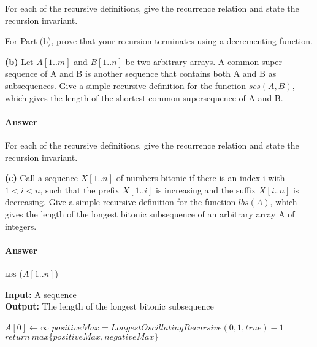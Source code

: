 \documentclass{article}
\begin{document}
For each of the recursive definitions, give the recurrence
relation and state the recursion invariant.

For Part (b), prove that your recursion terminates
using a decrementing function.

{\bf (b)} Let $A[1.. m]$ and $B[1.. n]$ be two arbitrary arrays. A common super-
sequence of A and B is another sequence that contains both A and B
as subsequences. Give a simple recursive definition for the function
$scs(A, B)$, which gives the length of the shortest common supersequence
of A and B.

\paragraph{Answer}

\todo{}



For each of the recursive definitions, give the recurrence
relation and state the recursion invariant.

{\bf (c)} Call a sequence $X[1.. n]$ of numbers bitonic if there is an index i with
$1 < i < n$, such that the prefix $X[1.. i]$ is increasing and the suffix
$X[i .. n]$ is decreasing. Give a simple recursive definition for the function
$lbs(A)$, which gives the length of the longest bitonic subsequence of an
arbitrary array A of integers.

\paragraph{Answer}

\begin{algorithm} \caption{\textsc{lbs} ($A[1..n]$)}\label{alg:seb}
    {\bf Input:} A sequence\\
    {\bf Output:} The length of the longest bitonic subsequence
    \begin{algorithmic}[1]
        \State$A[0] \gets \infty$
        \State$positiveMax = LongestOscillatingRecursive(0, 1, true) -1$
        \State$return\ max\{positiveMax, negativeMax\}$
    \end{algorithmic}
\end{algorithm}
\end{document}
